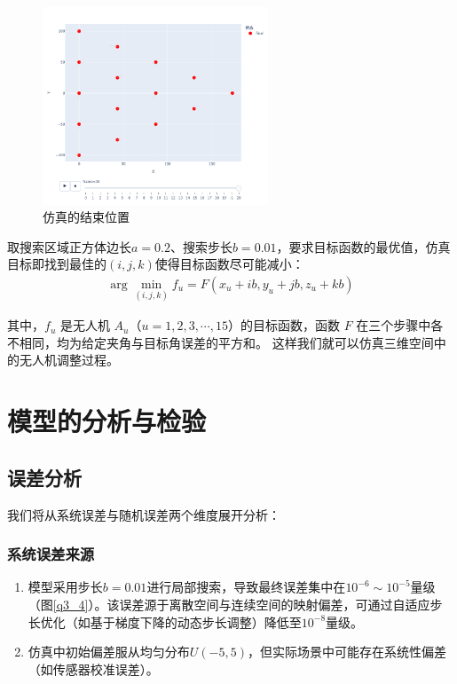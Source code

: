 \documentclass[withoutpreface,bwprint]{cumcmthesis} %
\begin{document}
\begin{figure}[H]
    \centering
    \includegraphics[width=0.6\textwidth]{../figure/end_4.png} 
    \caption{仿真的结束位置}
    \label{q4_2}    
\end{figure}

取搜索区域正方体边长\( a = 0.2 \)、搜索步长\( b = 0.01 \)，要求目标函数的最优值，仿真目标即找到最佳的\( (i,j,k) \)使得目标函数尽可能减小：
\begin{align}
    \arg\min\limits_{(i,j,k)} f_u = F(x_u + ib, y_u + jb, z_u + kb)
\end{align}


其中，\( f_u \) 是无人机 \( A_u \)（\( u = 1,2,3,\cdots,15 \)）的目标函数，函数 \( F \) 在三个步骤中各不相同，均为给定夹角与目标角误差的平方和。
这样我们就可以仿真三维空间中的无人机调整过程。



\section{模型的分析与检验}
\subsection{误差分析}
我们将从系统误差与随机误差两个维度展开分析：

\subsubsection{系统误差来源}


\begin{enumerate}
    \item 模型采用步长$b=0.01$进行局部搜索，导致最终误差集中在$10^{-6} \sim 10^{-5}$量级（图\ref{q3_4}）。该误差源于离散空间与连续空间的映射偏差，可通过自适应步长优化（如基于梯度下降的动态步长调整）降低至$10^{−8}$量级。
    \item ​仿真中初始偏差服从均匀分布$U(−5,5)$，但实际场景中可能存在系统性偏差（如传感器校准误差）。
    
\end{enumerate}
\end{document}
